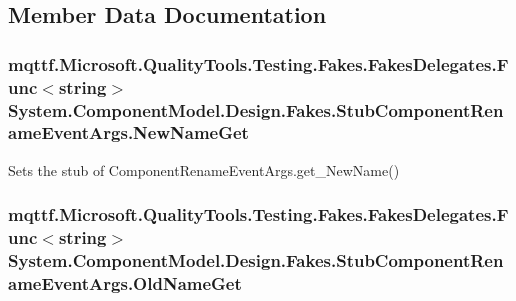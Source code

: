 \subsection{Member Data Documentation}
\hypertarget{class_system_1_1_component_model_1_1_design_1_1_fakes_1_1_stub_component_rename_event_args_aa5ce70e30440931eef0167cf47731b16}{
\subsubsection[{New\-Name\-Get}]{\setlength{\rightskip}{0pt plus 5cm}mqttf.\-Microsoft.\-Quality\-Tools.\-Testing.\-Fakes.\-Fakes\-Delegates.\-Func$<$string$>$ System.\-Component\-Model.\-Design.\-Fakes.\-Stub\-Component\-Rename\-Event\-Args.\-New\-Name\-Get}}\label{class_system_1_1_component_model_1_1_design_1_1_fakes_1_1_stub_component_rename_event_args_aa5ce70e30440931eef0167cf47731b16}


Sets the stub of Component\-Rename\-Event\-Args.\-get\-\_\-\-New\-Name()

\hypertarget{class_system_1_1_component_model_1_1_design_1_1_fakes_1_1_stub_component_rename_event_args_adc0491bb4b2f884c91b321ac331bea28}{
\subsubsection[{Old\-Name\-Get}]{\setlength{\rightskip}{0pt plus 5cm}mqttf.\-Microsoft.\-Quality\-Tools.\-Testing.\-Fakes.\-Fakes\-Delegates.\-Func$<$string$>$ System.\-Component\-Model.\-Design.\-Fakes.\-Stub\-Component\-Rename\-Event\-Args.\-Old\-Name\-Get}}\label{class_system_1_1_component_model_1_1_design_1_1_fakes_1_1_stub_component_rename_event_args_adc0491bb4b2f884c91b321ac331bea28}


